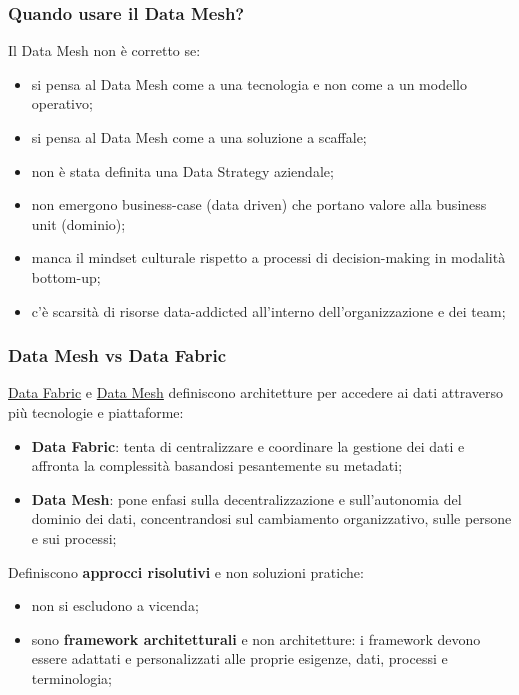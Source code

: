 \subsubsection{Quando usare il Data Mesh?}\label{sub:db_quando_usare_il_data_mesh} %
Il Data Mesh non è corretto se:
\begin{itemize}
    \item si pensa al Data Mesh come a una tecnologia e non come a un modello operativo;
    \item si pensa al Data Mesh come a una soluzione a scaffale;
    \item non è stata definita una Data Strategy aziendale;
    \item non emergono business-case (data driven) che portano valore alla business unit (dominio);
    \item manca il mindset culturale rispetto a processi di decision-making in modalità bottom-up;
    \item c'è scarsità di risorse data-addicted all'interno dell'organizzazione e dei team;
\end{itemize}
%
\subsubsection{Data Mesh vs Data Fabric}\label{sub:db_data_mesh_vs_data_fabric} %
\hyperref[sub:db_data_fabric]{Data Fabric} e \hyperref[sub:db_data_mesh]{Data Mesh} definiscono architetture per accedere ai dati attraverso più tecnologie e piattaforme:
\begin{itemize}
    \item \textbf{Data Fabric}: tenta di centralizzare e coordinare la gestione dei dati e affronta la complessità basandosi pesantemente su metadati;
    \item \textbf{Data Mesh}: pone enfasi sulla decentralizzazione e sull'autonomia del dominio dei dati, concentrandosi sul cambiamento organizzativo, sulle persone e sui processi;
\end{itemize}
\begin{warning}
    Definiscono \textbf{approcci risolutivi} e non soluzioni pratiche:
    \begin{itemize}
        \item non si escludono a vicenda;
        \item sono \textbf{framework architetturali} e non architetture: i framework devono essere adattati e personalizzati alle proprie esigenze, dati,  processi e terminologia;
    \end{itemize}
\end{warning}
